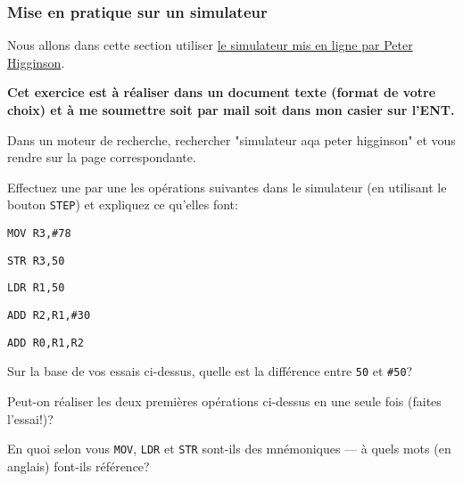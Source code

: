 \documentclass[12pt]{article}
\begin{document}
	 \subsubsection*{Mise en pratique sur un simulateur}
	 
	 Nous allons dans cette section utiliser \href{https://www.peterhigginson.co.uk/AQA}{le simulateur mis en ligne par Peter Higginson}.
	 
	 \begin{MonExo}
	 	\textbf{Cet exercice est à réaliser dans un document texte (format de votre choix) et à me soumettre soit par mail soit dans mon casier sur l'ENT.}
	 	\begin{alphenum}
	 		\item Dans un moteur de recherche, rechercher "simulateur aqa peter higginson" et vous rendre sur la page correspondante.
	 		\item Effectuez une par une les opérations suivantes dans le simulateur (en utilisant le bouton \texttt{STEP}) et expliquez ce qu'elles font:
	 		\begin{alphenum}
	 			\item \texttt{MOV R3,\#78}
	 			\item \texttt{STR R3,50}
	 			\item \texttt{LDR R1,50}
	 			\item \texttt{ADD R2,R1,\#30}
	 			\item \texttt{ADD R0,R1,R2}
	 		\end{alphenum}
	 		\item Sur la base de vos essais ci-dessus, quelle est la différence entre \texttt{50} et \texttt{\#50}?
	 		\item Peut-on réaliser les deux premières opérations ci-dessus en une seule fois (faites l'essai!)?
	 		\item En quoi selon vous \texttt{MOV}, \texttt{LDR} et \texttt{STR} sont-ils des mnémoniques --- à quels mots (en anglais) font-ils référence?
	 	\end{alphenum}
	 \end{MonExo}
	 
\end{document}
